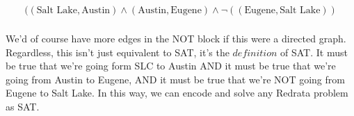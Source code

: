 \documentclass[a4paper]{article}
\begin{document}
\begin{equation*}
\begin{split}
((\mbox{Salt Lake},\mbox{Austin}) \wedge (\mbox{Austin},\mbox{Eugene}) \wedge \neg((\mbox{Eugene},\mbox{Salt Lake})) \\
\end{split}
\end{equation*}

We'd of course have more edges in the NOT block if this were a directed graph. Regardless, this isn't just equivalent to SAT, it's the $\textit{definition}$ of SAT. It must be true that we're going form SLC to Austin AND it must be true that we're going from Austin to Eugene, AND it must be true that we're NOT going from Eugene to Salt Lake. In this way, we can encode and solve any Redrata problem as SAT.
\end{document}
